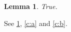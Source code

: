 \documentclass{article}
\newtheorem{lem}{Lemma}
\newcounter{myc}
\begin{document}
\begin{lem}\label{le:b} True. \end{lem}
\label{c:a}
\label{c:b}
See \cref{le:b}, \cref{c:a} and \cref{c:b}.
\end{document}
